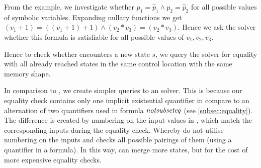 From the example, we investigate whether $p_1 = \widehat{p}_1 \wedge p_2 =
\widehat{p}_2$ for all possible values of symbolic variables. Expanding nullary
functions we get $(v_1 + 1) = ((v_1 + 1) + 1) \wedge (v_2 * v_3) = (v_2 * v_3)$. Hence
we ask the \SMT solver whether this formula is satisfiable for all possible
values of $v_1, v_2, v_3$.

Hence to check whether \DIVINE encounters a new state $s$, we query the \SMT solver
for equality with all already reached states in the same control location with the same memory shape.

In comparison to \SymDIVINE, we create simpler queries to an \SMT solver.  This
is because our equality check contains only one implicit existential quantifier
in compare to an alternation of two quantifiers used in \SymDIVINE formula
$\mathit{notsubseteq}$ (see \autoref{subsec:equality}). The difference is created by
numbering on the input values in \DIVINE, which match the corresponding inputs
during the equality check. Whereby \SymDIVINE do not utilise numbering on the
inputs and checks all possible pairings of them (using a quantifier in a
formula). In this way, \SymDIVINE can merge more states, but for the cost of
more expensive equality checks.


